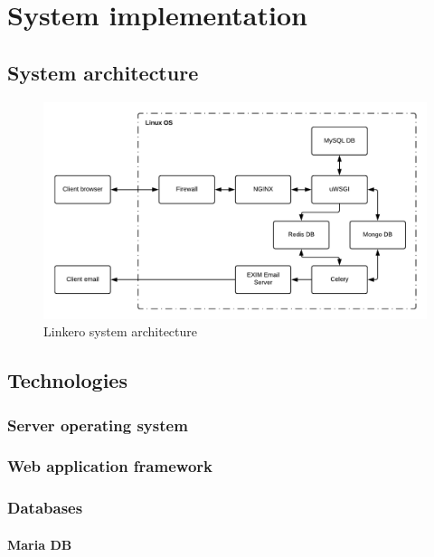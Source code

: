 \chapter{System implementation}

\section{System architecture}

\begin{figure}[h!]
\centering
\includegraphics[scale=0.8]{imgs/SystemArchitecture.pdf}
\caption{Linkero system architecture}
\label{fig:sysarch}
\end{figure}

\section{Technologies}

\subsection{Server operating system}

\subsection{Web application framework}

\subsection{Databases}

\subsubsection{Maria DB}

